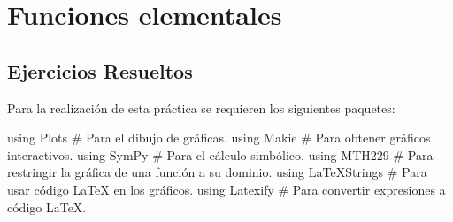 \documentclass[
  a4paper,
]{scrreport}
\newenvironment{Shaded}{\begin{snugshade}}{\end{snugshade}}
\newcommand{\BuiltInTok}[1]{\textcolor[rgb]{0.00,0.23,0.31}{#1}}
\newcommand{\CommentTok}[1]{\textcolor[rgb]{0.37,0.37,0.37}{#1}}
\newcommand{\ImportTok}[1]{\textcolor[rgb]{0.00,0.46,0.62}{#1}}
\theoremstyle{definition}
\theoremstyle{remark}
\begin{document}

\chapter{Funciones elementales}\label{funciones-elementales}

\section{Ejercicios Resueltos}\label{ejercicios-resueltos-1}

Para la realización de esta práctica se requieren los siguientes
paquetes:

\begin{Shaded}
\begin{Highlighting}[]
\ImportTok{using} \BuiltInTok{Plots}  \CommentTok{\# Para el dibujo de gráficas.}
\ImportTok{using} \BuiltInTok{Makie} \CommentTok{\# Para obtener gráficos interactivos.}
\ImportTok{using} \BuiltInTok{SymPy} \CommentTok{\# Para el cálculo simbólico.}
\ImportTok{using} \BuiltInTok{MTH229} \CommentTok{\# Para restringir la gráfica de una función a su dominio.}
\ImportTok{using} \BuiltInTok{LaTeXStrings}  \CommentTok{\# Para usar código LaTeX en los gráficos.}
\ImportTok{using} \BuiltInTok{Latexify}  \CommentTok{\# Para convertir expresiones a código LaTeX.}
\end{Highlighting}
\end{Shaded}
\end{document}
